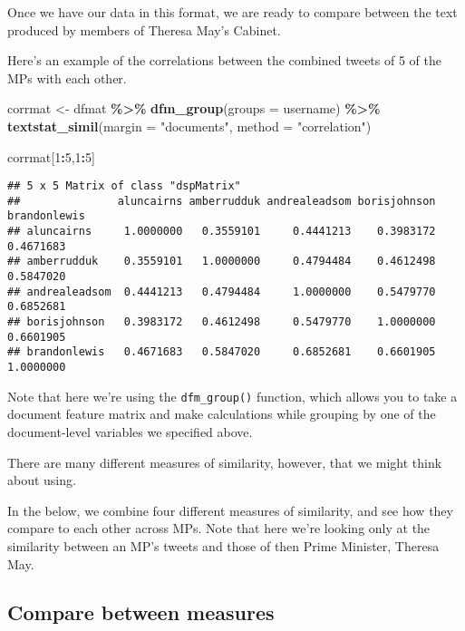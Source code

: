 \documentclass[
]{article}
\newenvironment{Shaded}{\begin{snugshade}}{\end{snugshade}}
\newcommand{\AttributeTok}[1]{\textcolor[rgb]{0.13,0.29,0.53}{#1}}
\newcommand{\DecValTok}[1]{\textcolor[rgb]{0.00,0.00,0.81}{#1}}
\newcommand{\FunctionTok}[1]{\textcolor[rgb]{0.13,0.29,0.53}{\textbf{#1}}}
\newcommand{\NormalTok}[1]{#1}
\newcommand{\OtherTok}[1]{\textcolor[rgb]{0.56,0.35,0.01}{#1}}
\newcommand{\SpecialCharTok}[1]{\textcolor[rgb]{0.81,0.36,0.00}{\textbf{#1}}}
\newcommand{\StringTok}[1]{\textcolor[rgb]{0.31,0.60,0.02}{#1}}
\begin{document}
Once we have our data in this format, we are ready to compare between
the text produced by members of Theresa May's Cabinet.

Here's an example of the correlations between the combined tweets of 5
of the MPs with each other.

\begin{Shaded}
\begin{Highlighting}[]
\NormalTok{corrmat }\OtherTok{\textless{}{-}}\NormalTok{ dfmat }\SpecialCharTok{\%\textgreater{}\%}
  \FunctionTok{dfm\_group}\NormalTok{(}\AttributeTok{groups =}\NormalTok{ username) }\SpecialCharTok{\%\textgreater{}\%}
  \FunctionTok{textstat\_simil}\NormalTok{(}\AttributeTok{margin =} \StringTok{"documents"}\NormalTok{, }\AttributeTok{method =} \StringTok{"correlation"}\NormalTok{)}

\NormalTok{corrmat[}\DecValTok{1}\SpecialCharTok{:}\DecValTok{5}\NormalTok{,}\DecValTok{1}\SpecialCharTok{:}\DecValTok{5}\NormalTok{]}
\end{Highlighting}
\end{Shaded}

\begin{verbatim}
## 5 x 5 Matrix of class "dspMatrix"
##               aluncairns amberrudduk andrealeadsom borisjohnson brandonlewis
## aluncairns     1.0000000   0.3559101     0.4441213    0.3983172    0.4671683
## amberrudduk    0.3559101   1.0000000     0.4794484    0.4612498    0.5847020
## andrealeadsom  0.4441213   0.4794484     1.0000000    0.5479770    0.6852681
## borisjohnson   0.3983172   0.4612498     0.5479770    1.0000000    0.6601905
## brandonlewis   0.4671683   0.5847020     0.6852681    0.6601905    1.0000000
\end{verbatim}

Note that here we're using the \texttt{dfm\_group()} function, which
allows you to take a document feature matrix and make calculations while
grouping by one of the document-level variables we specified above.

There are many different measures of similarity, however, that we might
think about using.

In the below, we combine four different measures of similarity, and see
how they compare to each other across MPs. Note that here we're looking
only at the similarity between an MP's tweets and those of then Prime
Minister, Theresa May.

\subsection{Compare between measures}\label{compare-between-measures}
\end{document}
